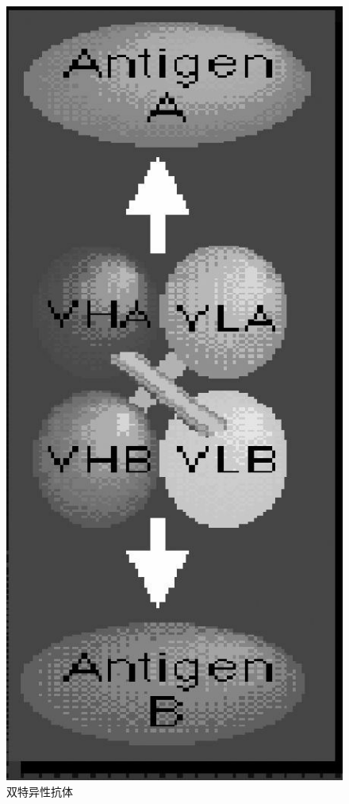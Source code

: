 \begin{figure}[!htbp]
 \centering
 \includegraphics{./images/Image00076.jpg}
 \captionsetup{justification=centering}
 \caption{双特异性抗体}
 \label{fig4-16}
  \end{figure} 

